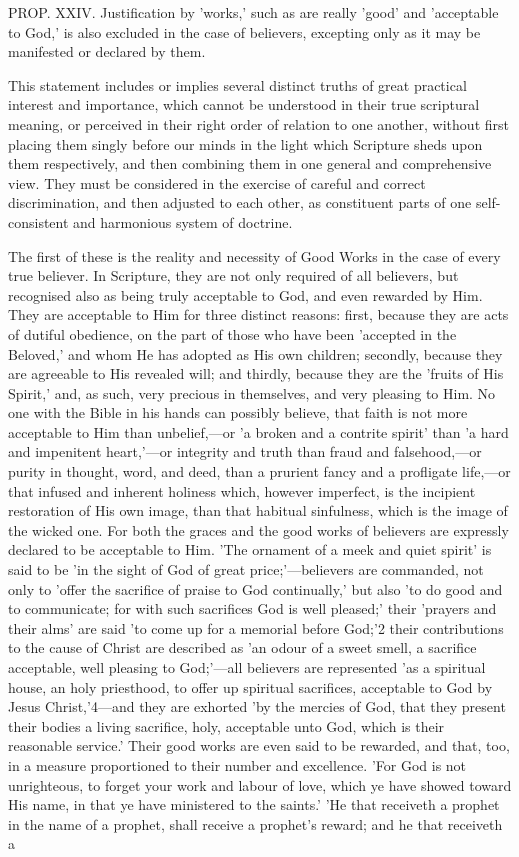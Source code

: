 \documentclass[
]{book}
\begin{document}
PROP. XXIV. Justification by 'works,' such as are really 'good' and 'acceptable to God,' is also excluded in the case of believers, excepting only as it may be manifested or declared by them.

This statement includes or implies several distinct truths of great practical interest and importance, which cannot be understood in their true scriptural meaning, or perceived in their right order of relation to one another, without first placing them singly before our minds in the light which Scripture sheds upon them respectively, and then combining them in one general and comprehensive view. They must be considered in the exercise of careful and correct discrimination, and then adjusted to each other, as constituent parts of one self-consistent and harmonious system of doctrine.

The first of these is the reality and necessity of Good Works in the case of every true believer. In Scripture, they are not only required of all believers, but recognised also as being truly acceptable to God, and even rewarded by Him. They are acceptable to Him for three distinct reasons: first, because they are acts of dutiful obedience, on the part of those who have been 'accepted in the Beloved,' and whom He has adopted as His own children; secondly, because they are agreeable to His revealed will; and thirdly, because they are the 'fruits of His Spirit,' and, as such, very precious in themselves, and very pleasing to Him. No one with the Bible in his hands can possibly believe, that faith is not more acceptable to Him than unbelief,---or 'a broken and a contrite spirit' than 'a hard and impenitent heart,'---or integrity and truth than fraud and falsehood,---or purity in thought, word, and deed, than a prurient fancy and a profligate life,---or that infused and inherent holiness which, however imperfect, is the incipient restoration of His own image, than that habitual sinfulness, which is the image of the wicked one. For both the graces and the good works of believers are expressly declared to be acceptable to Him. 'The ornament of a meek and quiet spirit' is said to be 'in the sight of God of great price;'---believers are commanded, not only to 'offer the sacrifice of praise to God continually,' but also 'to do good and to communicate; for with such sacrifices God is well pleased;' their 'prayers and their alms' are said 'to come up for a memorial before God;'2 their contributions to the cause of Christ are described as 'an odour of a sweet smell, a sacrifice acceptable, well pleasing to God;'---all believers are represented 'as a spiritual house, an holy priesthood, to offer up spiritual sacrifices, acceptable to God by Jesus Christ,'4---and they are exhorted 'by the mercies of God, that they present their bodies a living sacrifice, holy, acceptable unto God, which is their reasonable service.' Their good works are even said to be rewarded, and that, too, in a measure proportioned to their number and excellence. 'For God is not unrighteous, to forget your work and labour of love, which ye have showed toward His name, in that ye have ministered to the saints.' 'He that receiveth a prophet in the name of a prophet, shall receive a prophet's reward; and he that receiveth a 
\end{document}
